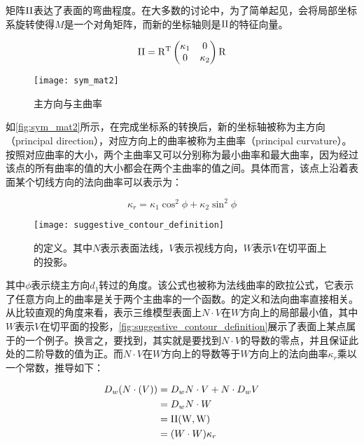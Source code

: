 矩阵$\rm II$表达了表面的弯曲程度。在大多数的讨论中，为了简单起见，会将局部坐标系旋转使得$M$是一个对角矩阵，而新的坐标轴则是$\rm II$的特征向量。

\begin{equation}
    \rm II = R^T
    \begin{pmatrix}
        \kappa_1 & 0 \\
        0 & \kappa_2
    \end{pmatrix}
    R
\end{equation}

\begin{figure}[tbh]
    \centering
    \texttt{[image: sym\_mat2]}
    \caption{\label{fig:sym_mat2}
    主方向与主曲率}
\end{figure}

如\autoref{fig:sym_mat2}\cite{rusinkiewicz2008line}所示，在完成坐标系的转换后，新的坐标轴被称为主方向（principal direction），对应方向上的曲率被称为主曲率（principal curvature）。按照对应曲率的大小，两个主曲率又可以分别称为最小曲率和最大曲率，因为经过该点的所有曲率的值的大小都会在两个主曲率的值之间。具体而言，该点上沿着表面某个切线方向的法向曲率可以表示为：

\begin{equation}
    \kappa_r = \kappa_1\cos^2\phi + \kappa_2\sin^2\phi
\end{equation}

\begin{figure}[tbp]
    \centering
    \texttt{[image: suggestive\_contour\_definition]}
    \caption{\label{fig:suggestive_contour_definition}
    \scon{}的定义。其中$N$表示表面法线，$V$表示视线方向，$W$表示$V$在切平面上的投影。}
\end{figure}

其中$\phi$表示绕主方向$d_1$转过的角度。该公式也被称为法线曲率的欧拉公式，它表示了任意方向上的曲率是关于两个主曲率的一个函数。\scon{}的定义和法向曲率直接相关。从比较直观的角度来看，\scon{}表示三维模型表面上$N\cdot{V}$在$W$方向上的局部最小值，其中$W$表示$V$在切平面的投影，\autoref{fig:suggestive_contour_definition}展示了表面上某点属于\scon{}的一个例子。换言之，要找到\scon{}，其实就是要找到$N\cdot{V}$的导数的零点，并且保证此处的二阶导数的值为正。而$N\cdot{V}$在$W$方向上的导数等于$W$方向上的法向曲率$\kappa_r$乘以一个常数，推导如下：

\begin{align}
    D_w(N\cdot(V)) &= D_w{N}\cdot{V} + N\cdot{D_w{V}} \\
                   &= D_w{N}\cdot{W} \\
                   &= \rm II(W, W) \\
                   &= (W\cdot{W})\kappa_r
\end{align}
  
